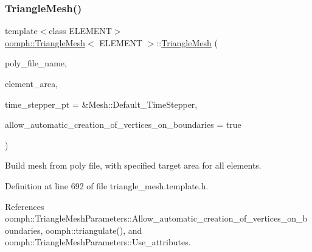 \mbox{\label{classoomph_1_1TriangleMesh_aa0346dc3c88395c949f2e2c0209aea39}} 
\subsubsection{\texorpdfstring{Triangle\+Mesh()}{TriangleMesh()}\hspace{0.1cm}{\footnotesize\ttfamily [4/5]}}
{\footnotesize\ttfamily template$<$class E\+L\+E\+M\+E\+NT$>$ \\
\hyperlink{classoomph_1_1TriangleMesh}{oomph\+::\+Triangle\+Mesh}$<$ E\+L\+E\+M\+E\+NT $>$\+::\hyperlink{classoomph_1_1TriangleMesh}{Triangle\+Mesh} (\begin{DoxyParamCaption}\item[{const std\+::string \&}]{poly\+\_\+file\+\_\+name,  }\item[{const double \&}]{element\+\_\+area,  }\item[{Time\+Stepper $\ast$}]{time\+\_\+stepper\+\_\+pt = {\ttfamily \&Mesh\+:\+:Default\+\_\+TimeStepper},  }\item[{const bool \&}]{allow\+\_\+automatic\+\_\+creation\+\_\+of\+\_\+vertices\+\_\+on\+\_\+boundaries = {\ttfamily true} }\end{DoxyParamCaption})\hspace{0.3cm}{\ttfamily [inline]}}



Build mesh from poly file, with specified target area for all elements. 



Definition at line 692 of file triangle\+\_\+mesh.\+template.\+h.



References oomph\+::\+Triangle\+Mesh\+Parameters\+::\+Allow\+\_\+automatic\+\_\+creation\+\_\+of\+\_\+vertices\+\_\+on\+\_\+boundaries, oomph\+::triangulate(), and oomph\+::\+Triangle\+Mesh\+Parameters\+::\+Use\+\_\+attributes.

\mbox{\label{classoomph_1_1TriangleMesh_a2a6d680ea50dca34788f4f0c480d9d75}} 
